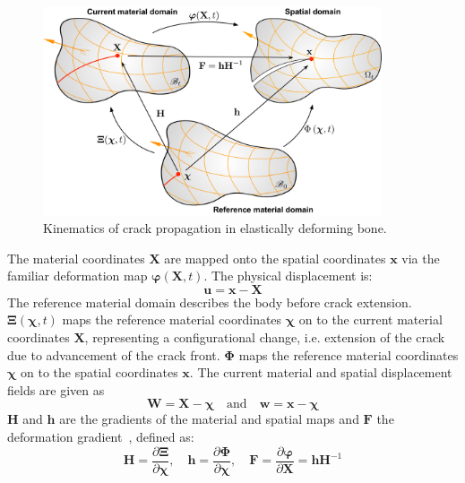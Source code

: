 \documentclass[review]{elsarticle}
\numberwithin{equation}{section}
\begin{document}
\begin{figure}[th] 
\setlength{\fboxsep}{0pt}%
\setlength{\fboxrule}{0pt}%
\begin{center}
\includegraphics[width=10cm]{Figures/domains5.pdf} 
\end{center}
\caption{Kinematics of crack propagation in elastically deforming bone.}
\label{fig:domains4}
\end{figure}

The material coordinates $\mathbf{X}$ are mapped onto the spatial coordinates $\mathbf{x}$ via the
familiar deformation map $\boldsymbol\varphi(\mathbf{X},t)$. The physical displacement is:
\begin{equation}
\mathbf{u}=\mathbf{x}-\mathbf{X}
\end{equation}
The reference material domain describes the body before crack extension. ${\boldsymbol\Xi}(\boldsymbol\chi,t)$ maps the reference material coordinates $\boldsymbol\chi$ on to the current material coordinates $\mathbf{X}$, representing a configurational change, i.e. extension of the crack due to advancement of the crack front. ${\boldsymbol\Phi}$ maps the reference material coordinates $\boldsymbol\chi$ on to the spatial coordinates $\mathbf{x}$. The current material and spatial displacement fields are given as
\begin{equation}
\mathbf{W} = \mathbf{X} - {\boldsymbol\chi}\quad\textrm{and}\quad
\mathbf{w} = \mathbf{x} - {\boldsymbol\chi}
\end{equation}
$\mathbf{H}$ and $\mathbf{h}$ are the gradients of the material and spatial maps and $\mathbf{F}$ the deformation gradient~\cite{kaczmarczyk2014three}, defined as:
\begin{equation}
\mathbf{H}=\frac{\partial {\boldsymbol\Xi}}{\partial {\boldsymbol\chi}},\quad\mathbf{h}=\frac{\partial {\boldsymbol\Phi}}{\partial {\boldsymbol\chi}},\quad\mathbf{F} = \frac{\partial \boldsymbol\varphi}{\partial \mathbf{X}} = \mathbf{h}\mathbf{H}^{-1}
\end{equation}
\end{document}
